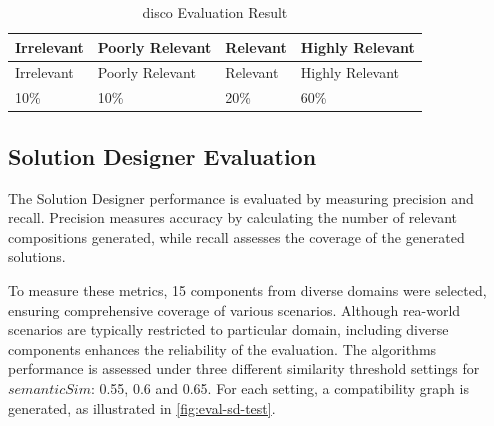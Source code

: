 \hypertarget{tbl:disco-eval}{}
\begin{longtable}{@{}llll@{}}
\caption{\label{tbl:disco-eval}\gls{disco} Evaluation Result}\tabularnewline
\toprule
\begin{minipage}[b]{0.23\columnwidth}\raggedright
Irrelevant\strut
\end{minipage} & 
\begin{minipage}[b]{0.24\columnwidth}\raggedright
Poorly Relevant\strut
\end{minipage} & 
\begin{minipage}[b]{0.24\columnwidth}\raggedright
Relevant\strut
\end{minipage} & 
\begin{minipage}[b]{0.29\columnwidth}\raggedright
Highly Relevant\strut
\end{minipage} \tabularnewline
\midrule
\endfirsthead

\toprule
\begin{minipage}[b]{0.23\columnwidth}\raggedright
Irrelevant\strut
\end{minipage} & 
\begin{minipage}[b]{0.24\columnwidth}\raggedright
Poorly Relevant\strut
\end{minipage} & 
\begin{minipage}[b]{0.24\columnwidth}\raggedright
Relevant\strut
\end{minipage} & 
\begin{minipage}[b]{0.29\columnwidth}\raggedright
Highly Relevant\strut
\end{minipage} \tabularnewline
\midrule
\endhead

10\% & 10\% & 20\% & 60\% \tabularnewline

\bottomrule
\end{longtable}

\vspace{-10pt}
\hypertarget{sec:eval-sd}{%
\subsection{Solution Designer Evaluation}\label{sec:eval-sd}}
\vspace{10pt}

The Solution Designer performance is evaluated by measuring precision
and recall. Precision measures accuracy by calculating the number of
relevant compositions generated, while recall assesses the coverage of
the generated solutions.

To measure these metrics, 15 components from diverse domains were
selected, ensuring comprehensive coverage of various scenarios. Although
rea-world scenarios are typically restricted to particular domain,
including diverse components enhances the reliability of the evaluation.
The algorithm\textquotesingle s performance is assessed under three
different similarity threshold settings for \(semanticSim\): 0.55, 0.6
and 0.65. For each setting, a compatibility graph is generated, as
illustrated in \cref{fig:eval-sd-test}.

